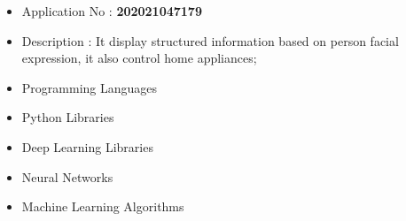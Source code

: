 
\begin{itemize}
    \item Application No : \textbf{202021047179}
    \item \textcolor{emphasis}{Description : It display structured information based on person facial expression, it also control home appliances;}  
\end{itemize}


\begin{itemize}
\item \textcolor{emphasis}{Programming Languages} 
\end{itemize}


\divider\smallskip

\begin{itemize}
    \item \textcolor{emphasis}{Python Libraries}
    \end{itemize}
    
    \divider\smallskip
    
\begin{itemize}
    \item \textcolor{emphasis}{Deep Learning Libraries}
    \end{itemize}
    
    \divider\smallskip

\begin{itemize}
        \item \textcolor{emphasis}{Neural Networks}    
\end{itemize}
    
\divider\smallskip

        \begin{itemize}
            \item \textcolor{emphasis}{Machine Learning Algorithms}    
    \end{itemize}

    \divider\smallskip

